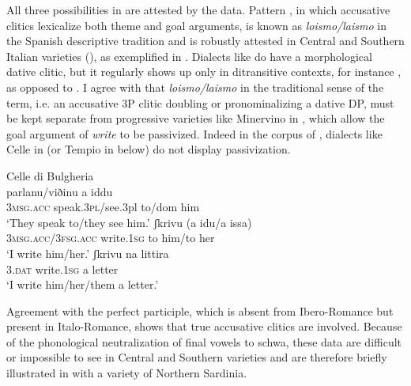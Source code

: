 \documentclass[output=paper,colorlinks,citecolor=brown]{./langscibook}
\begin{document}
All three possibilities in  are attested by the data. Pattern , in which accusative clitics lexicalize both theme and goal arguments, is known as \textit{loismo/laismo} in the Spanish descriptive tradition and is robustly attested in Central and Southern Italian varieties (\citealt[§633]{Rohlfs1969}), as exemplified in . Dialects like  do have a morphological dative clitic, but it regularly shows up only in ditransitive contexts, for instance , as opposed to . I agree with \citet{Pineda2016} that \textit{loismo/laismo} in the traditional sense of the term, i.e. an accusative 3P clitic doubling or pronominalizing a dative DP, must be kept separate from progressive varieties like Minervino in , which allow the goal argument of \textit{write} to be passivized. Indeed in the corpus of \citet{ManziniSavoia2005}, dialects like Celle in  (or Tempio in  below) do not display passivization. 

\ea%
    \label{ex:manzini:21}
    Celle di Bulgheria \citep{ManziniSavoia2005}\\
    \ea\label{ex:manzini:21a} 
        {parlanu/viðinu}   {a}   {iddu}\\
        \textsc{3msg.acc}  speak.\textsc{3pl}/see.3pl   to/dom him\\
    \glt ‘They speak to/they see him.’
    \ex\label{ex:manzini:21b} 
           {ʃkrivu}     (a {idu/a} issa)\\
        \textsc{3msg.acc/3fsg.acc} write.\textsc{1sg}   to him/to her\\
    \glt ‘I write him/her.’  
    \ex\label{ex:manzini:21c} 
       {ʃkrivu}     {na} {littira}\\
        \textsc{3.dat}   write.\textsc{1sg}   a letter\\
    \glt ‘I write him/her/them a letter.’
    \z
\z


Agreement with the perfect participle, which is absent from Ibero-Romance but present in Italo-Romance, shows that true accusative clitics are involved. Because of the phonological neutralization of final vowels to schwa, these data are difficult or impossible to see in Central and Southern varieties and are therefore briefly illustrated in  with a variety of Northern Sardinia.
\end{document}
